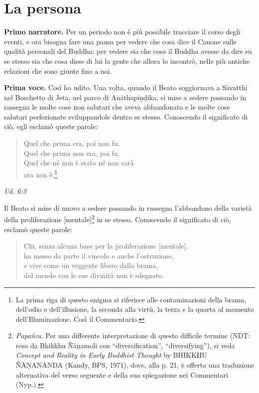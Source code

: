 \chapter{La persona}

\textbf{Primo narratore.} Per un periodo non è più possibile tracciare il corso
degli eventi, e ora bisogna fare una pausa per vedere che cosa dice il
Canone sulle qualità personali del Buddha: per vedere sia che cosa il
Buddha avesse da dire su se stesso sia che cosa disse di lui la gente
che allora lo incontrò, nelle più antiche relazioni che sono giunte fino
a noi.


\textbf{Prima voce.} Così ho udito. Una volta, quando il Beato soggiornava a
Sāvatthī nel Boschetto di Jeta, nel parco di Anāthapiṇḍika, si mise a
sedere passando in rassegna le molte cose non salutari che aveva
abbandonato e le molte cose salutari perfezionate sviluppandole dentro
se stesso. Conoscendo il significato di ciò, egli esclamò queste parole:


\begin{quotation}
Quel che prima era, poi non fu. \\
Quel che prima non era, poi fu. \\
Quel che né non è stato né non sarà \\
ora non è.\footnote{La prima riga di questo enigma si riferisce alle contaminazioni della brama, dell’odio e dell’illusione, la seconda alla virtù, la terza e la quarta al momento dell’Illuminazione. Così il Commentario.}
\end{quotation}

\emph{Ud. 6:3}


Il Beato si mise di nuovo a sedere passando in rassegna l’abbandono
della varietà della proliferazione [mentale]\footnote{\emph{Papañca}. Per una differente interpretazione di questo difficile termine (NDT: reso da Bhikkhu Ñāṇamoli con “diversification”, “diversifying”), si veda \emph{Concept and Reality in Early Buddhist Thought} by BHIKKHU ÑĀṆANANDA (Kandy, BPS, 1971), dove, alla p. 21, è offerta una traduzione alternativa del verso seguente e della sua spiegazione nei Commentari (Nyp.).} in se
stesso. Conoscendo il significato di ciò, esclamò queste parole:


\begin{quotation}
Chi, senza alcuna base per la proliferazione [mentale], \\
ha messo da parte il vincolo e anche l’ostruzione, \\
e vive come un veggente libero dalla brama, \\
dal mondo con le sue divinità non è sdegnato.
\end{quotation}

